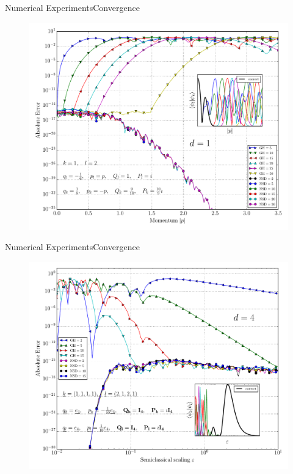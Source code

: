 \documentclass{beamer}
\begin{document}

\begin{frame}{Numerical Experiments}{Convergence}
  \begin{figure}
    \centering
    \includegraphics[width=0.7\linewidth]{./fig/conv_momentum.pdf}
  \end{figure}
\end{frame}


\begin{frame}{Numerical Experiments}{Convergence}
  \begin{figure}
    \centering
    \includegraphics[width=0.7\linewidth]{./fig/conv_eps.pdf}
  \end{figure}
\end{frame}
\end{document}

